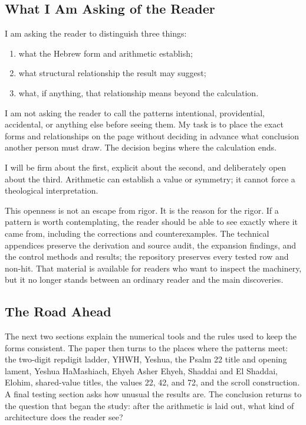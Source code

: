 \subsection{What I Am Asking of the Reader}

I am asking the reader to distinguish three things:

\begin{enumerate}
\item what the Hebrew form and arithmetic establish;
\item what structural relationship the result may suggest;
\item what, if anything, that relationship means beyond the calculation.
\end{enumerate}

I am not asking the reader to call the patterns intentional, providential, accidental, or anything else before seeing them. My task is to place the exact forms and relationships on the page without deciding in advance what conclusion another person must draw. The decision begins where the calculation ends.

I will be firm about the first, explicit about the second, and deliberately open about the third. Arithmetic can establish a value or symmetry; it cannot force a theological interpretation.

This openness is not an escape from rigor. It is the reason for the rigor. If a pattern is worth contemplating, the reader should be able to see exactly where it came from, including the corrections and counterexamples. The technical appendices preserve the derivation and source audit, the expansion findings, and the control methods and results; the repository preserves every tested row and non-hit. That material is available for readers who want to inspect the machinery, but it no longer stands between an ordinary reader and the main discoveries.

\subsection{The Road Ahead}

The next two sections explain the numerical tools and the rules used to keep the forms consistent. The paper then turns to the places where the patterns meet: the two-digit repdigit ladder, YHWH, Yeshua, the Psalm 22 title and opening lament, Yeshua HaMashiach, Ehyeh Asher Ehyeh, Shaddai and El Shaddai, Elohim, shared-value titles, the values 22, 42, and 72, and the scroll construction. A final testing section asks how unusual the results are. The conclusion returns to the question that began the study: after the arithmetic is laid out, what kind of architecture does the reader see?
